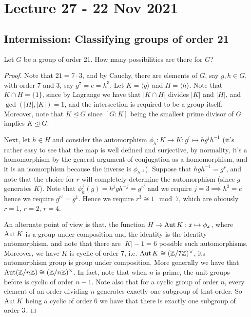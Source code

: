 \section{Lecture 27 - 22 Nov 2021}
\subsection{Intermission: Classifying groups of order 21}
\begin{example}
  Let $G$ be a group of order 21. How many possibilities are there for $G$?
\end{example}
\begin{proof}
  Note that $21=7\cdot 3$, and by Cauchy, there are elements of $G$, say $g,h\in G$, with
  order $7$ and $3$, say $g^7=e=h^3$. Let $K=\langle g\rangle$ and $H=\langle h\rangle$.
  Note that $K\cap H=\{1\}$, since by Lagrange we have that $|K\cap H|$ divides $|K|$ and
  $|H|$, and $\gcd(|H|,|K|)=1$, and the intersection is required to be a group itself.
  Moreover, note that $K\trianglelefteq G$ since $[G:K]$ being the smallest prime divisor
  of $G$ implies $K\trianglelefteq G$.

  Next, let $h\in H$ and consider the automorphism $\phi_h:K\to K:g^i\mapsto hg^ih^{-1}$
  (it's rather easy to see that the map is well defined and surjective, by normality, it's
  a homomorphism by the general argument of conjugation as a homomorphism, and it is an
  isomorphism because the inverse is $\phi_{h^{-1}}$). Suppose that $hgh^{-1}=g^r$, and note
  that the choice for $r$ will completely determine the automorphism (since $g$ generates
  $K$). Note that $\phi_h^{j}(g)=h^jgh^{-j}=g^{r^j}$ and we require $j=3\implies h^3=e$
  hence we require $g^{r^j}=g^1$. Hence we require $r^3\cong 1 \mod 7$, which are obiously
  $r=1$, $r=2$, $r=4$. 

  An alternate point of view is that, the function $H\to \operatorname{Aut} K:x\mapsto \phi_x$, where
  $\operatorname{Aut} K$ is a group under composition and the identity is the identity automorphism, and
  note that there are $|K|-1=6$ possible such automorphisms.  Moreover, we have $K$ is
  cyclic of order $7$, i.e. $\operatorname{Aut} K \cong (\mathbb Z/7\mathbb Z)^{\times}$, its automorphism group is
  group under composition. More generally we have that $\operatorname{Aut}(\mathbb Z/n\mathbb Z)\cong
  (\mathbb Z/n\mathbb Z)^{\times}$.  In fact, note that when $n$ is prime, the unit groups before is
  cyclic of order $n-1$. Note also that for a cyclic group of order $n$, every element of an
  order dividing $n$ generates exactly one subgroup of that order. So $\operatorname{Aut} K$ being
  a cyclic of order $6$ we have that there is exactly one subgroup of order $3$.


\end{proof}
